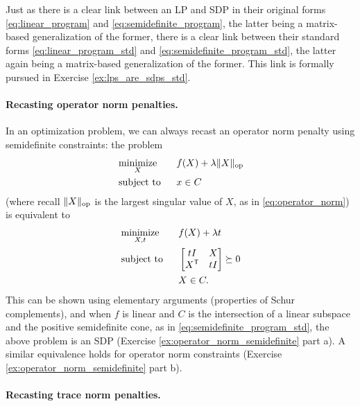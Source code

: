 Just as there is a clear link between an LP and SDP in their original forms
\eqref{eq:linear_program} and \eqref{eq:semidefinite_program}, the latter 
being a matrix-based generalization of the former, there is a clear link
between their standard forms \eqref{eq:linear_program_std} and
\eqref{eq:semidefinite_program_std}, the latter again being a matrix-based 
generalization of the former. This link is formally pursued in Exercise
\ref{ex:lps_are_sdps_std}.  

\paragraph{Recasting operator norm penalties.}

In an optimization problem, we can always recast an operator norm penalty using    
semidefinite constraints: the problem 
\begin{alignat*}{2}
&\operatorname*{minimize}_X \quad && f(X) + \lambda \|X\|_{\mathrm{op}} \\
&\operatorname{subject\,\,to} && x \in C
\end{alignat*}
(where recall $\|X\|_{\mathrm{op}}$ is the largest singular value of $X$, as in
\eqref{eq:operator_norm}) is equivalent to  
\begin{alignat*}{2}
&\operatorname*{minimize}_{X,t} \quad && f(X) + \lambda t \\
&\operatorname{subject\,\,to} && \begin{bmatrix} t I & X \\ 
X^{\mathsf{T}} & t I \end{bmatrix} \succeq 0 \\
& && X \in C.
\end{alignat*}
This can be shown using elementary arguments (properties of Schur complements),
and when $f$ is linear and $C$ is the intersection of a linear subspace and the
positive semidefinite cone, as in \eqref{eq:semidefinite_program_std}, the above
problem is an SDP (Exercise \ref{ex:operator_norm_semidefinite} part a). A
similar equivalence holds for operator norm constraints (Exercise
\ref{ex:operator_norm_semidefinite} part b).

\paragraph{Recasting trace norm penalties.}

